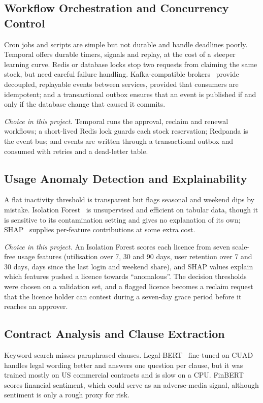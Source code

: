 \subsection{Workflow Orchestration and Concurrency Control}
Cron jobs and scripts are simple but not durable and handle deadlines poorly. Temporal offers durable timers, signals and replay, at the cost of a steeper learning curve. Redis or database locks stop two requests from claiming the same stock, but need careful failure handling. Kafka-compatible brokers~\cite{kreps2011kafka} provide decoupled, replayable events between services, provided that consumers are idempotent; and a transactional outbox ensures that an event is published if and only if the database change that caused it commits.

\emph{Choice in this project.} Temporal runs the approval, reclaim and renewal workflows; a short-lived Redis lock guards each stock reservation; Redpanda is the event bus; and events are written through a transactional outbox and consumed with retries and a dead-letter table.

\subsection{Usage Anomaly Detection and Explainability}
A flat inactivity threshold is transparent but flags seasonal and weekend dips by mistake. Isolation Forest~\cite{liu2008isolation} is unsupervised and efficient on tabular data, though it is sensitive to its contamination setting and gives no explanation of its own; SHAP~\cite{lundberg2017shap} supplies per-feature contributions at some extra cost.

\emph{Choice in this project.} An Isolation Forest scores each licence from seven scale-free usage features (utilisation over 7, 30 and 90 days, user retention over 7 and 30 days, days since the last login and weekend share), and SHAP values explain which features pushed a licence towards ``anomalous''. The decision thresholds were chosen on a validation set, and a flagged licence becomes a reclaim request that the licence holder can contest during a seven-day grace period before it reaches an approver.

\subsection{Contract Analysis and Clause Extraction}
Keyword search misses paraphrased clauses. Legal-BERT~\cite{chalkidis2020legalbert} fine-tuned on CUAD~\cite{hendrycks2021cuad} handles legal wording better and answers one question per clause, but it was trained mostly on US commercial contracts and is slow on a CPU. FinBERT~\cite{araci2019finbert} scores financial sentiment, which could serve as an adverse-media signal, although sentiment is only a rough proxy for risk.

